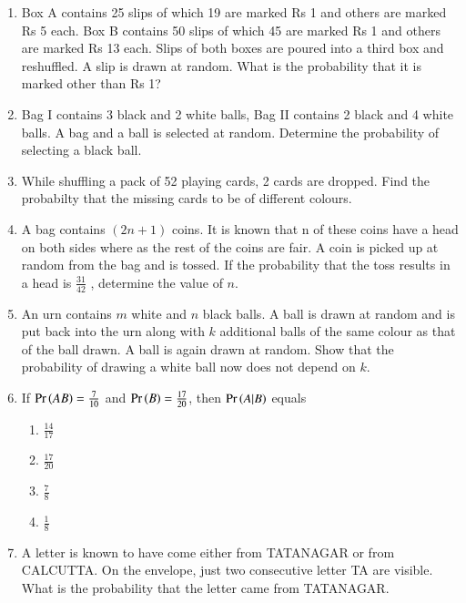 \begin{enumerate}[label=\thesubsection.\arabic*,ref=\thesubsection.\theenumi]
\solution
\item Box A contains 25 slips of which 19 are marked Rs 1 and others are marked Rs 5 each. Box B contains 50 slips of which 45 are marked Rs 1 and others are marked Rs 13 each. Slips of both boxes are poured into a third box and reshuffled. A slip is drawn at random. What is the probability that it is marked other than Rs 1?\\
\solution
%
\item Bag I contains 3 black and 2 white balls, Bag II contains 2 black and 4 white
balls. A bag and a ball is selected at random. Determine the probability of selecting
a black ball.\\
\solution
%
\item While shuffling a pack of 52 playing cards, 2 cards are dropped. Find the probabilty that the missing cards to be of different colours.\\
\solution
%
\item A bag contains $(2n + 1)$ coins. It is known that n of these coins have a head on
both sides where as the rest of the coins are fair. A coin is picked up at random
from the bag and is tossed. If the probability that the toss results in a head is $\frac{31}{42}$
, determine the value of $n$.\\
\solution
%
\item An urn contains $m$ white and $n$ black balls. A ball is drawn at random and is put
back into the urn along with $k$ additional balls of the same colour as that of the
ball drawn. A ball is again drawn at random. Show that the probability of
drawing a white ball now does not depend on $k$.\\
\solution
%
\item If $\Pr\left(AB\right)=\frac{7}{10}$ and $\Pr\left(B\right)=\frac{17}{20}$, then $\Pr\left(A|B\right)$ equals
\begin{enumerate}
\item $\frac{14}{17}$
\item $\frac{17}{20}$
\item $\frac{7}{8}$
\item $\frac{1}{8}$
\end{enumerate}
%
\item 
A letter is known to have come either from TATANAGAR or from CALCUTTA. On the envelope, just two consecutive letter TA are visible. What is the probability that the letter came from TATANAGAR.\\

\end{enumerate}
